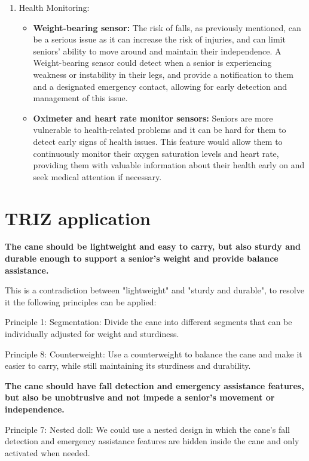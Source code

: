 \documentclass[12pt, twoside]{report}
\begin{document}
\begin{enumerate}
    \item Health Monitoring:
    \begin{itemize}
        \item \textbf{Weight-bearing sensor:} The risk of falls, as previously mentioned, can be a serious issue as it can increase the risk of injuries, and can limit seniors' ability to move around and maintain their independence. A Weight-bearing sensor could detect when a senior is experiencing weakness or instability in their legs, and provide a notification to them and a designated emergency contact, allowing for early detection and management of this issue.
        
        \item \textbf{Oximeter and heart rate monitor sensors:} Seniors are more vulnerable to health-related problems and it can be hard for them to detect early signs of health issues. This feature would allow them to continuously monitor their oxygen saturation levels and heart rate, providing them with valuable information about their health early on and seek medical attention if necessary.
    \end{itemize}
\end{enumerate}

\section{TRIZ application}
\textbf{The cane should be lightweight and easy to carry, but also sturdy and durable enough to support a senior's weight and provide balance assistance.}

This is a contradiction between "lightweight" and "sturdy and durable", to resolve it the following principles can be applied:

Principle 1: Segmentation: Divide the cane into different segments that can be individually adjusted for weight and sturdiness.

Principle 8: Counterweight: Use a counterweight to balance the cane and make it easier to carry, while still maintaining its sturdiness and durability.

\textbf{The cane should have fall detection and emergency assistance features, but also be unobtrusive and not impede a senior's movement or independence.}

Principle 7: Nested doll: We could use a nested design in which the cane's fall detection and emergency assistance features are hidden inside the cane and only activated when needed.
\end{document}
